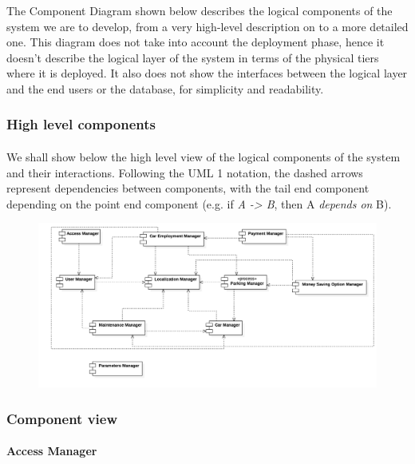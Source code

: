 The Component Diagram shown below describes the logical components of the system we are to develop, from a very high-level description on to a more detailed one. This diagram does not take into account the deployment phase, hence it doesn't describe the logical layer of the system in terms of the physical tiers where it is deployed. It also does not show the interfaces between the logical layer and the end users or the database, for simplicity and readability. %


	\subsubsection{High level components}
		\paragraph{} We shall show below the high level view of the logical components of the system and their interactions. Following the UML 1 notation, the dashed arrows represent dependencies between components, with the tail end component depending on the point end component (e.g. if \textit{A -> B}, then A \textit{depends on} B). 

		
		\begin{figure}[h]
			\includegraphics[scale=0.24]{img/component_diagrams/01_high_level_component_view.png}
		\end{figure}

	\subsubsection{Component view}
	
	
	
		\paragraph{Access Manager}
		
